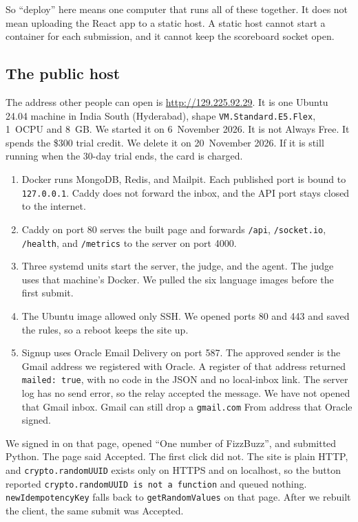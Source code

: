 \documentclass[11pt,a4paper]{article}
\begin{document}
So ``deploy'' here means one computer that runs all of these together. It does not mean uploading the React app to a static host. A static host cannot start a container for each submission, and it cannot keep the scoreboard socket open.

\subsection{The public host}

The address other people can open is \url{http://129.225.92.29}. It is one Ubuntu 24.04 machine in India South (Hyderabad), shape \texttt{VM.Standard.E5.Flex}, 1~OCPU and 8~GB. We started it on 6~November 2026. It is not Always Free. It spends the \$300 trial credit. We delete it on 20~November 2026. If it is still running when the 30-day trial ends, the card is charged.

\begin{enumerate}
\item Docker runs MongoDB, Redis, and Mailpit. Each published port is bound to \texttt{127.0.0.1}. Caddy does not forward the inbox, and the API port stays closed to the internet.
\item Caddy on port 80 serves the built page and forwards \texttt{/api}, \texttt{/socket.io}, \texttt{/health}, and \texttt{/metrics} to the server on port 4000.
\item Three systemd units start the server, the judge, and the agent. The judge uses that machine's Docker. We pulled the six language images before the first submit.
\item The Ubuntu image allowed only SSH. We opened ports 80 and 443 and saved the rules, so a reboot keeps the site up.
\item Signup uses Oracle Email Delivery on port 587. The approved sender is the Gmail address we registered with Oracle. A register of that address returned \texttt{mailed: true}, with no code in the JSON and no local-inbox link. The server log has no send error, so the relay accepted the message. We have not opened that Gmail inbox. Gmail can still drop a \texttt{gmail.com} From address that Oracle signed.
\end{enumerate}

We signed in on that page, opened ``One number of FizzBuzz'', and submitted Python. The page said Accepted. The first click did not. The site is plain HTTP, and \texttt{crypto.randomUUID} exists only on HTTPS and on localhost, so the button reported \texttt{crypto.randomUUID is not a function} and queued nothing. \texttt{newIdempotencyKey} falls back to \texttt{getRandomValues} on that page. After we rebuilt the client, the same submit was Accepted.
\end{document}
